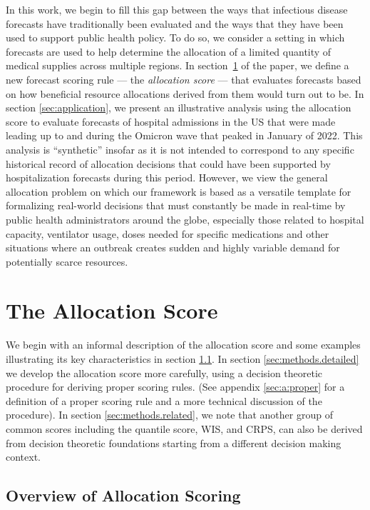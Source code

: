 \documentclass{article}\usepackage[]{graphicx}\usepackage[]{xcolor}
\begin{document}
In this work, we begin to fill this gap between the ways that infectious disease forecasts have traditionally been
evaluated and the ways that they have been used to support public health policy. To do so, we consider a setting in
which forecasts are used to help determine the allocation of a limited quantity of medical supplies across multiple
regions. In section~\ref{sec:methods} of the paper, we define a new forecast scoring rule --- the {\em allocation score}
--- that evaluates forecasts based on how beneficial resource allocations derived from them would turn out to be. In
section \ref{sec:application}, we present an illustrative analysis using the allocation score to evaluate forecasts of
hospital admissions in the US that were made leading up to and during the Omicron wave that peaked in January of 2022.
This analysis is ``synthetic'' insofar as it is not intended to correspond to any specific historical record of
allocation decisions that could have been supported by hospitalization forecasts during this period. However, we view
the general allocation problem on which our framework is based as a versatile template for formalizing real-world
decisions that must constantly be made in real-time by public health administrators around the globe, especially those
related to hospital capacity, ventilator usage, doses needed for specific medications and other situations where an
outbreak creates sudden and highly variable demand for potentially scarce resources.  

\section{The Allocation Score}
\label{sec:methods}

We begin with an informal description of the allocation score and some examples illustrating its key characteristics in
section \ref{sec:methods.overview}. In section \ref{sec:methods.detailed} we develop the allocation score more
carefully, using a decision theoretic procedure for deriving proper scoring rules. (See appendix \ref{sec:a:proper}
for a definition of a proper scoring rule and a more technical discussion of the procedure). In section
\ref{sec:methods.related}, we note that another group of common scores including the quantile score, WIS, and CRPS, can
also be derived from decision theoretic foundations \textemdash starting from a different decision making context.

\subsection{Overview of Allocation Scoring}
\label{sec:methods.overview}
\end{document}
